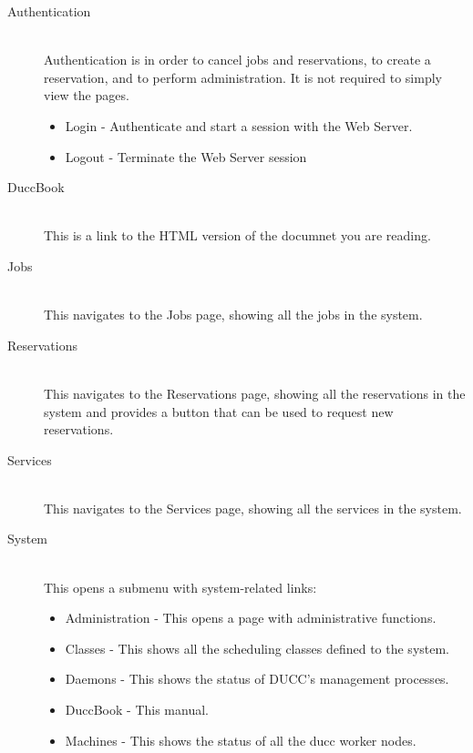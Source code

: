        \begin{description}
          \item[Authentication] \hfill \\ 
            Authentication is in order to cancel jobs and reservations, to create a
            reservation, and to perform administration. It is not required to simply view the pages.

            \begin{itemize}
              \item Login - Authenticate and start a session with the Web Server.             
              \item Logout - Terminate the Web Server session 
            \end{itemize}


          \item[DuccBook] \hfill \\
            This is a link to the HTML version of the documnet you are reading.

          \item[Jobs] \hfill \\
            This navigates to the Jobs page, showing all the jobs in the system.

          \item[Reservations] \hfill \\
            This navigates to the Reservations page, showing all the reservations
            in the system and provides a button that can be used to request new reservations. 

          \item[Services] \hfill \\
            This navigates to the Services page, showing all the services in the
            system.

          \item[System] \hfill \\
            This opens a submenu with system-related links:
            \begin{itemize}
              \item[] Administration - This opens a page with administrative functions. 
              \item[] Classes - This shows all the scheduling classes defined to the system. 
              \item[] Daemons - This shows the status of DUCC's management processes. 
              \item[] DuccBook - This manual. 
              \item[] Machines - This shows the status of all the ducc worker nodes. 
            \end{itemize}
      \end{description}              

